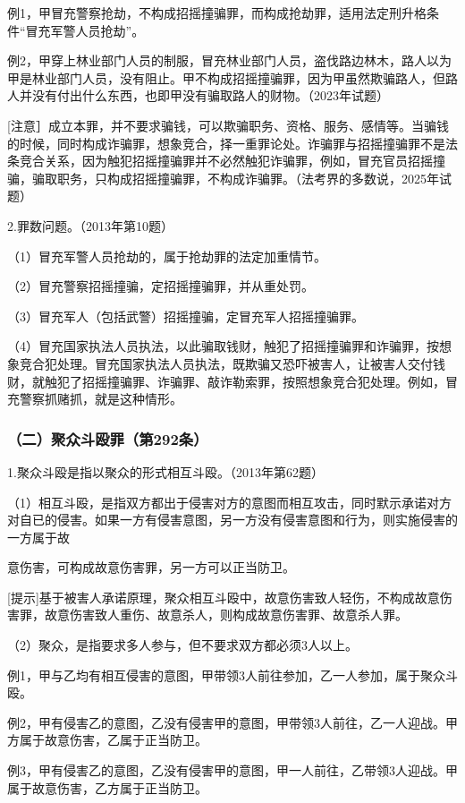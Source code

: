 例1，甲冒充警察抢劫，不构成招摇撞骗罪，而构成抢劫罪，适用法定刑升格条件“冒充军警人员抢劫”。

例2，甲穿上林业部门人员的制服，冒充林业部门人员，盗伐路边林木，路人以为甲是林业部门人员，没有阻止。甲不构成招摇撞骗罪，因为甲虽然欺骗路人，但路人并没有付出什么东西，也即甲没有骗取路人的财物。（2023年试题）

[注意］成立本罪，并不要求骗钱，可以欺骗职务、资格、服务、感情等。当骗钱的时候，同时构成诈骗罪，想象竞合，择一重罪论处。诈骗罪与招摇撞骗罪不是法条竞合关系，因为触犯招摇撞骗罪并不必然触犯诈骗罪，例如，冒充官员招摇撞骗，骗取职务，只构成招摇撞骗罪，不构成诈骗罪。（法考界的多数说，2025年试题）

2.罪数问题。（2013年第10题）

（1）冒充军警人员抢劫的，属于抢劫罪的法定加重情节。

（2）冒充警察招摇撞骗，定招摇撞骗罪，并从重处罚。

（3）冒充军人（包括武警）招摇撞骗，定冒充军人招摇撞骗罪。

（4）冒充国家执法人员执法，以此骗取钱财，触犯了招摇撞骗罪和诈骗罪，按想象竞合犯处理。冒充国家执法人员执法，既欺骗又恐吓被害人，让被害人交付钱财，就触犯了招摇撞骗罪、诈骗罪、敲诈勒索罪，按照想象竞合犯处理。例如，冒充警察抓赌抓，就是这种情形。

\subsubsection*{（二）聚众斗殴罪（第292条）}

1.聚众斗殴是指以聚众的形式相互斗殴。（2013年第62题）

（1）相互斗殴，是指双方都出于侵害对方的意图而相互攻击，同时默示承诺对方对自已的侵害。如果一方有侵害意图，另一方没有侵害意图和行为，则实施侵害的一方属于故

意伤害，可构成故意伤害罪，另一方可以正当防卫。

[提示]基于被害人承诺原理，聚众相互斗殴中，故意伤害致人轻伤，不构成故意伤害罪，故意伤害致人重伤、故意杀人，则构成故意伤害罪、故意杀人罪。

（2）聚众，是指要求多人参与，但不要求双方都必须3人以上。

例1，甲与乙均有相互侵害的意图，甲带领3人前往参加，乙一人参加，属于聚众斗殴。

例2，甲有侵害乙的意图，乙没有侵害甲的意图，甲带领3人前往，乙一人迎战。甲方属于故意伤害，乙属于正当防卫。

例3，甲有侵害乙的意图，乙没有侵害甲的意图，甲一人前往，乙带领3人迎战。甲属于故意伤害，乙方属于正当防卫。

